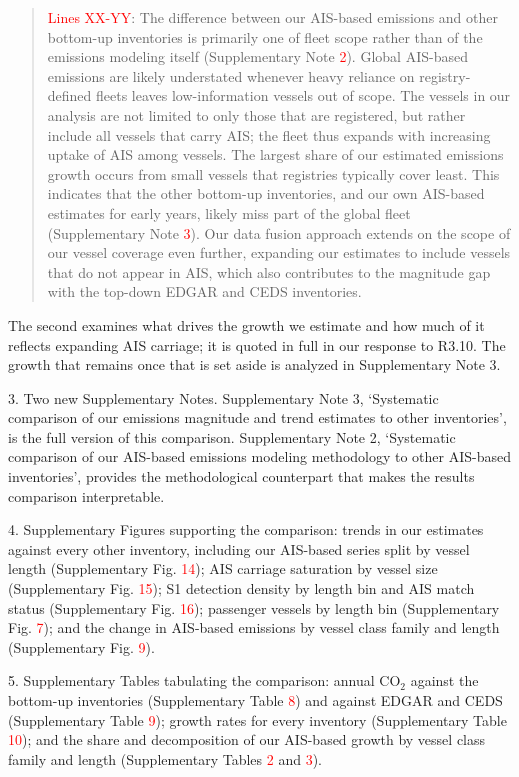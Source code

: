 \documentclass[11pt]{article}
\begin{document}
\begin{quote}
\textcolor{red}{Lines XX-YY}: The difference between our AIS-based emissions and other bottom-up inventories is primarily one of fleet scope rather than of the emissions modeling itself (Supplementary Note \textcolor{red}{2}). Global AIS-based emissions are likely understated whenever heavy reliance on registry-defined fleets leaves low-information vessels out of scope. The vessels in our analysis are not limited to only those that are registered, but rather include all vessels that carry AIS; the fleet thus expands with increasing uptake of AIS among vessels. The largest share of our estimated emissions growth occurs from small vessels that registries typically cover least. This indicates that the other bottom-up inventories, and our own AIS-based estimates for early years, likely miss part of the global fleet (Supplementary Note \textcolor{red}{3}). Our data fusion approach extends on the scope of our vessel coverage even further, expanding our estimates to include vessels that do not appear in AIS, which also contributes to the magnitude gap with the top-down EDGAR and CEDS inventories.
\end{quote}

The second examines what drives the growth we estimate and how much of it reflects expanding AIS carriage; it is quoted in full in our response to R3.10. The growth that remains once that is set aside is analyzed in Supplementary Note 3.

3. Two new Supplementary Notes. Supplementary Note 3, `Systematic comparison of our emissions magnitude and trend estimates to other inventories', is the full version of this comparison. Supplementary Note 2, `Systematic comparison of our AIS-based emissions modeling methodology to other AIS-based inventories', provides the methodological counterpart that makes the results comparison interpretable.

4. Supplementary Figures supporting the comparison: trends in our estimates against every other inventory, including our AIS-based series split by vessel length (Supplementary Fig. \textcolor{red}{14}); AIS carriage saturation by vessel size (Supplementary Fig. \textcolor{red}{15}); S1 detection density by length bin and AIS match status (Supplementary Fig. \textcolor{red}{16}); passenger vessels by length bin (Supplementary Fig. \textcolor{red}{7}); and the change in AIS-based emissions by vessel class family and length (Supplementary Fig. \textcolor{red}{9}).

5. Supplementary Tables tabulating the comparison: annual CO$_{2}$ against the bottom-up inventories (Supplementary Table \textcolor{red}{8}) and against EDGAR and CEDS (Supplementary Table \textcolor{red}{9}); growth rates for every inventory (Supplementary Table \textcolor{red}{10}); and the share and decomposition of our AIS-based growth by vessel class family and length (Supplementary Tables \textcolor{red}{2} and \textcolor{red}{3}).
\end{document}
